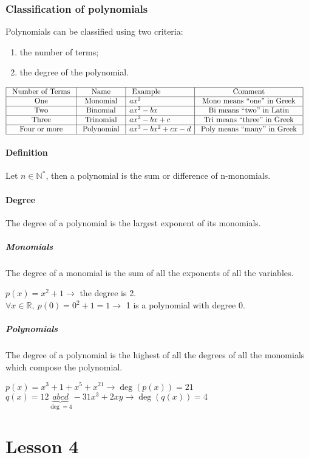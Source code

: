 \documentclass{article}
\begin{document}
\section{Classification of polynomials}
Polynomials can be classified using two criteria: 
\begin{enumerate}
    \item the number of terms;
    \item the degree of the polynomial.
\end{enumerate}
\begin{equation}
    \begin{aligned}
        &\begin{array}{|c|c|l|c|}
        \hline \text { Number of Terms } & \text { Name } & \text { Example } & \text { Comment } \\
        \hline \text { One } & \text { Monomial } & ax^2 & \text { Mono means ``one'' in Greek } \\
        \hline \text { Two } & \text { Binomial } & ax^2-b x & \text { Bi means ``two'' in Latin } \\
        \hline \text { Three } & \text { Trinomial } & ax^2-b x+c & \text { Tri means ``three'' in Greek } \\
        \hline \text { Four or more } & \text { Polynomial } & a x^3-b x^2+c x-d & \text { Poly means ``many'' in Greek } \\
        \hline
        \end{array}
    \end{aligned}
\end{equation}

\subsection{Definition}
Let $n \in \mathbb{N^*}$, then a polynomial is the sum or difference of n-monomials. 

\subsection{Degree}
The degree of a polynomial is the largest exponent of its monomials.

\subsubsection{Monomials}
The degree of a monomial is the sum of all the exponents of all the variables.

$p(x)=x^2+1 \rightarrow$ the degree is 2.\\
$\forall x \in \mathbb{R},\ p(0)=0^2+1=1 \rightarrow$ 1 is a polynomial with degree 0.

\subsubsection{Polynomials}
The degree of a polynomial is the highest of all the degrees of all the
monomials which compose the polynomial.

$p(x)=x^3+1+x^5+x^21 \rightarrow \deg(p(x))=21$\\
$q(x)=12 \underbrace{abcd}_{\deg=4} - 31x^3+2xy \rightarrow \deg(q(x))=4$ 

\newpage
\part{Lesson 4}
\end{document}
